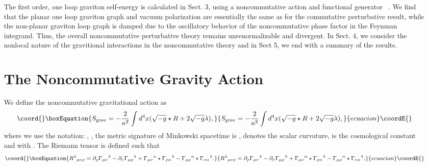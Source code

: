 \documentclass[a4paper,10pt]{article}
\begin{document}
The first order, one loop graviton self-energy is calculated in Sect.
3, using a noncommutative action and functional generator \coordHE{}
~\cite{Feynman,Goldberg,Fradkin,Veltman,Leibbrandt,Brown,Medrano,Duff,Duff2,Donoghue}.
We find that the planar one loop graviton graph and vacuum polarization are
essentially the same as for the commutative perturbative result, while the non-planar
graviton loop graph is damped due to the oscillatory behavior of the noncommutative
phase factor in the Feynman integrand. Thus, the overall noncommutative perturbative
theory remains unrenormalizable and divergent. In Sect. 4, we consider the nonlocal
nature of the gravitional interactions in the noncommutative theory and in Sect 5, we
end with a summary of the results.

\section{\bf The Noncommutative Gravity Action}

We define the noncommutative gravitational action as
\begin{equation}\coord{}\boxEquation{
S_{\rm grav}=-\frac{2}{\kappa^2}\int d^4x(\sqrt{-g}\star R+2\sqrt{-g}\lambda),
}{
S_{\rm grav}=-\frac{2}{\kappa^2}\int d^4x(\sqrt{-g}\star R+2\sqrt{-g}\lambda),
}{ecuacion}\coordE{}\end{equation}
where we use the notation: \coordHE{}, \coordHE{}, the
metric signature of Minkowski spacetime is \coordHE{}, \coordHE{} denotes the scalar curvature,
\myHighlight{$\lambda$}\coordHE{} is the cosmological constant and \coordHE{} with \coordHE{}. The Riemann
tensor is defined such that
\begin{equation}\coord{}\boxEquation{
{R^\lambda}_{\mu\nu\rho}=\partial_\rho{\Gamma_{\mu\nu}}^\lambda
-\partial_\nu{\Gamma_{\mu\rho}}^\lambda+
{\Gamma_{\mu\nu}}^\alpha\star{\Gamma_{\rho\alpha}}^\lambda
-{\Gamma_{\mu\rho}}^\alpha\star{\Gamma_{\nu\alpha}}^\lambda.
}{
{R^\lambda}_{\mu\nu\rho}=\partial_\rho{\Gamma_{\mu\nu}}^\lambda
-\partial_\nu{\Gamma_{\mu\rho}}^\lambda+
{\Gamma_{\mu\nu}}^\alpha\star{\Gamma_{\rho\alpha}}^\lambda
-{\Gamma_{\mu\rho}}^\alpha\star{\Gamma_{\nu\alpha}}^\lambda.
}{ecuacion}\coordE{}\end{equation}
\end{document}

